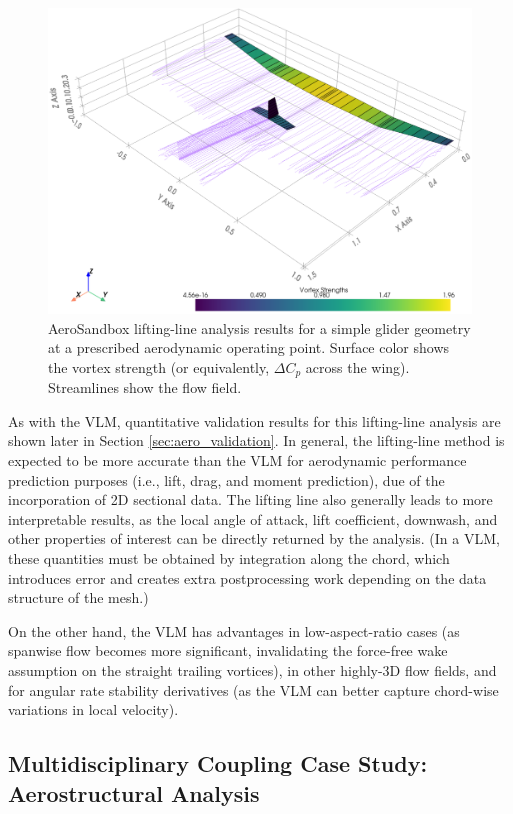 \begin{figure}[h]
    \centering
    \includegraphics[width=\textwidth]{../figures/ll.png}
    \caption{AeroSandbox lifting-line analysis results for a simple glider geometry at a prescribed aerodynamic operating point. Surface color shows the vortex strength (or equivalently, $\Delta C_p$ across the wing). Streamlines show the flow field.}
    \label{fig:ll}
\end{figure}

As with the VLM, quantitative validation results for this lifting-line analysis are shown later in Section \ref{sec:aero_validation}. In general, the lifting-line method is expected to be more accurate than the VLM for aerodynamic performance prediction purposes (i.e., lift, drag, and moment prediction), due of the incorporation of 2D sectional data. The lifting line also generally leads to more interpretable results, as the local angle of attack, lift coefficient, downwash, and other properties of interest can be directly returned by the analysis. (In a VLM, these quantities must be obtained by integration along the chord, which introduces error and creates extra postprocessing work depending on the data structure of the mesh.)

On the other hand, the VLM has advantages in low-aspect-ratio cases (as spanwise flow becomes more significant, invalidating the force-free wake assumption on the straight trailing vortices), in other highly-3D flow fields, and for angular rate stability derivatives (as the VLM can better capture chord-wise variations in local velocity).

\subsection{Multidisciplinary Coupling Case Study: Aerostructural Analysis}

